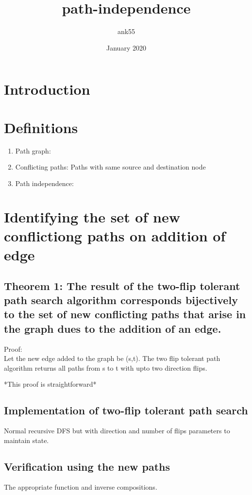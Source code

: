 \documentclass{article}
\title{path-independence}
\author{ank55 }
\date{January 2020}
\begin{document}
\maketitle

\section{Introduction}

\section{Definitions}
\begin{enumerate}
    \item Path graph:
    \item Conflicting paths: Paths with same source and destination node
    \item Path independence:
\end{enumerate}

\section{Identifying the set of new conflictiong paths on addition of edge}
\subsection{Theorem 1: The result of the two-flip tolerant path search algorithm corresponds bijectively to the set of new conflicting paths that arise in the graph dues to the addition of an edge.}

Proof:\\
Let the new edge added to the graph be (s,t).
The two flip tolerant path algorithm returns all paths from s to t with upto two direction flips.

*This proof is straightforward*

\subsection{Implementation of two-flip tolerant path search}
Normal recursive DFS but with direction and number of flips parameters to maintain state.

\subsection{Verification using the new paths}
The appropriate function and inverse compositions.
\end{document}
